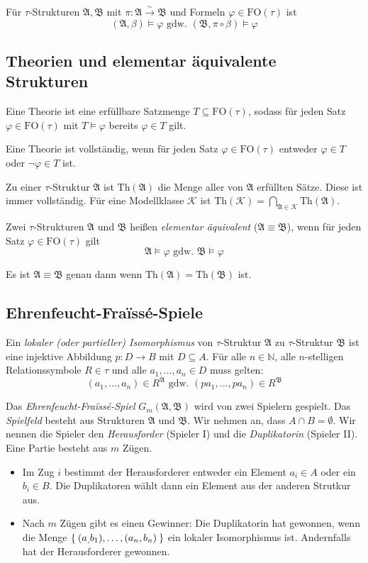\documentclass[a4paper,parskip=half*,DIV=15,fontsize=11pt]{scrartcl}
\newcommand{\A}{\mathfrak{A}}
\newcommand{\B}{\mathfrak{B}}
\newcommand{\FO}{\mathrm{FO}}
\newcommand{\isoTo}{\overset{\sim}{\to}}
\newcommand{\Th}{\mathrm{Th}}
\newcommand{\K}{\mathcal{K}}
\begin{document}
Für $\tau$-Strukturen $\A, \B$ mit $\pi : \A \isoTo \B$ und Formeln $\varphi \in \FO(\tau)$ ist
\[(\A, \beta) \models \varphi \text{ gdw.\ } (\B, \pi \circ \beta) \models \varphi\]

\subsection{Theorien und elementar äquivalente Strukturen}

Eine Theorie ist eine erfüllbare Satzmenge $T \subseteq \FO(\tau)$, sodass für jeden Satz $\varphi \in \FO(\tau)$ mit $T \models \varphi$ bereits $\varphi \in T$ gilt.

Eine Theorie ist vollständig, wenn für jeden Satz $\varphi \in \FO(\tau)$ entweder $\varphi \in T$ oder $\neg \varphi \in T$ ist.

Zu einer $\tau$-Struktur $\A$ ist $\Th(\A)$ die Menge aller von $\A$ erfüllten Sätze. Diese ist immer vollständig.
Für eine Modellklasse $\K$ ist $\Th(\K) = \bigcap_{\A \in \K} \Th(\A)$.

Zwei $\tau$-Strukturen $\A$ und $\B$ heißen \emph{elementar äquivalent} ($\A \equiv \B$), wenn für jeden Satz $\varphi \in \FO(\tau)$ gilt
\[\A \models \varphi \text{ gdw. } \B \models \varphi\]

Es ist $\A \equiv \B$ genau dann wenn $\Th(\A) = \Th(\B)$ ist.

\subsection{Ehrenfeucht-Fra\"issé-Spiele}

Ein \emph{lokaler (oder partieller) Isomorphismus} von $\tau$-Struktur $\A$ zu $\tau$-Struktur $\B$ ist eine injektive Abbildung $p : D \to B$ mit $D \subseteq A$. Für alle $n \in \mathbb{N}$, alle $n$-stelligen Relationssymbole $R \in \tau$ und alle $a_1, \ldots, a_n \in D$ muss gelten:
\[ (a_1, \ldots, a_n) \in R^\A \text{ gdw. } (p a_1, \ldots, p a_n) \in R^\B \]

Das \emph{Ehrenfeucht-Fra\"issé-Spiel} $G_m(\A, \B)$ wird von zwei Spielern gespielt. Das \emph{Spielfeld} besteht aus Strukturen $\A$ und $\B$. Wir nehmen an, dass $A \cap B = \emptyset$. Wir nennen die Spieler den \emph{Herausforder} (Spieler I) und die \emph{Duplikatorin} (Spieler II). Eine Partie besteht aus $m$ Zügen.

\begin{itemize}
  \item Im Zug $i$ bestimmt der Herausforderer entweder ein Element $a_i \in A$ oder ein $b_i \in B$. Die Duplikatoren wählt dann ein Element aus der anderen Strutkur aus.
  \item Nach $m$ Zügen gibt es einen Gewinner: Die Duplikatorin hat gewonnen, wenn die Menge $\Set{(a_,b_1), \ldots,  (a_n, b_n)}$ ein lokaler Isomorphismus ist. Andernfalls hat der Herausforderer gewonnen.
\end{itemize}
\end{document}
